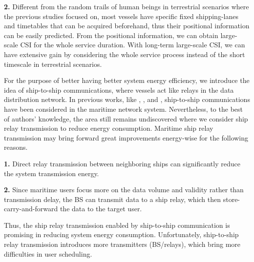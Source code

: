 \documentclass[conference]{IEEEtran}
\begin{document}
\textbf{2.} Different from the random trails of human beings in terrestrial scenarios where the previous studies focused on, most vessels have specific fixed shipping-lanes and timetables that can be acquired beforehand, thus their positional information can be easily predicted. From the positional information, we can obtain large-scale CSI  for the whole service duration. With long-term large-scale CSI, we can have extensive gain by considering the whole service process instead of the short timescale in terrestrial scenarios. 

For the purpose of better having better system energy efficiency, we introduce the idea of ship-to-ship communications, where vessels act like relays in the data distribution network. In previous works, like \cite{p321}, \cite{p32}, and \cite{p410}, ship-to-ship communications have been considered in the maritime network system. Nevertheless, to the best of authors' knowledge, the area still remains undiscovered where we consider ship relay transmission to reduce energy consumption. Maritime ship relay transmission may bring forward great improvements energy-wise for the following reasons.

\textbf{1.} Direct relay transmission between neighboring ships can significantly reduce the system transmission energy. 

\textbf{2.} Since maritime users focus more on the data volume and validity rather than transmission delay, the BS can transmit data to a ship relay, which then store-carry-and-forward the data to the target user. 

Thus, the ship relay transmission enabled by ship-to-ship communication is promising in reducing system energy consumption. 
Unfortunately, ship-to-ship relay transmission introduces more transmitters (BS/relays), which bring more difficulties in user scheduling. 

\end{document}
